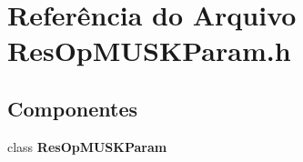 \section{Referência do Arquivo Res\+Op\+M\+U\+S\+K\+Param.\+h}
\label{_res_op_m_u_s_k_param_8h}
\subsection*{Componentes}
\begin{DoxyCompactItemize}
\item 
class {\bf Res\+Op\+M\+U\+S\+K\+Param}
\end{DoxyCompactItemize}
